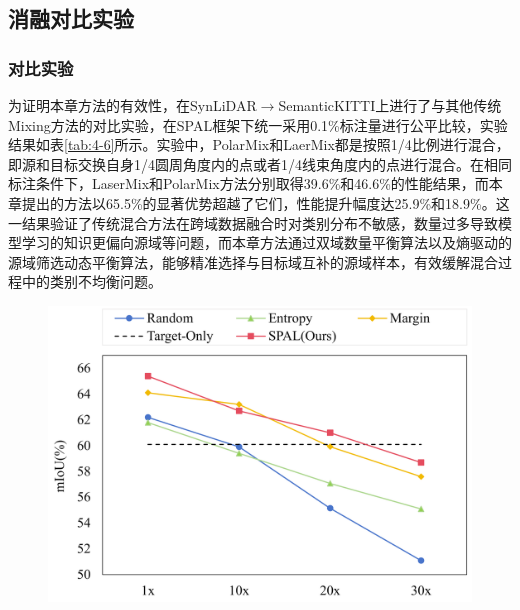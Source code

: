     \subsection{消融对比实验}
    \subsubsection{对比实验}
    
    为证明本章方法的有效性，在SynLiDAR$\to$SemanticKITTI上进行了与其他传统Mixing方法的对比实验，在SPAL框架下统一采用0.1\%标注量进行公平比较，实验结果如表\ref{tab:4-6}所示。实验中，PolarMix和LaerMix都是按照1/4比例进行混合，即源和目标交换自身1/4圆周角度内的点或者1/4线束角度内的点进行混合。在相同标注条件下，LaserMix和PolarMix方法分别取得39.6\%和46.6\%的性能结果，而本章提出的方法以65.5\%的显著优势超越了它们，性能提升幅度达25.9\%和18.9\%。这一结果验证了传统混合方法在跨域数据融合时对类别分布不敏感，数量过多导致模型学习的知识更偏向源域等问题，而本章方法通过双域数量平衡算法以及熵驱动的源域筛选动态平衡算法，能够精准选择与目标域互补的源域样本，有效缓解混合过程中的类别不均衡问题。%
    \vspace{-0.1cm}
    \begin{figure}[H]
        \centering
        \includegraphics[width = \textwidth]{ljx/figure/4-compare-al-mixing.pdf}
        \label{fig:4-compare-al-mixing}
    \end{figure}
